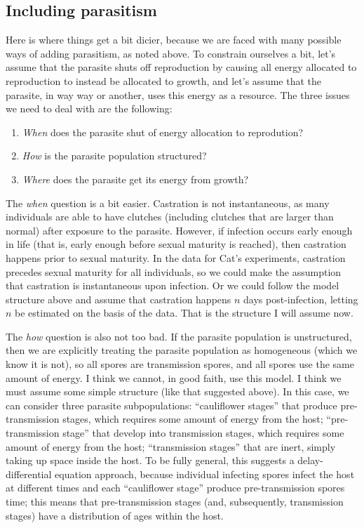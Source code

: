 \documentclass[11pt,reqno,final,pdftex]{amsart}\usepackage[]{graphicx}\usepackage[]{color}
\theoremstyle{plain}
\numberwithin{equation}{part}
\begin{document}
\subsection*{Including parasitism}
Here is where things get a bit dicier, because we are faced with many possible ways of adding parasitism, as noted above.
To constrain ourselves a bit, let's assume that the parasite shuts off reproduction by causing all energy allocated to reproduction to instead be allocated to growth, and let's assume that the parasite, in way way or another, uses this energy as a resource.
The three issues we need to deal with are the following:
\begin{enumerate}
\item \emph{When} does the parasite shut of energy allocation to reprodution?
\item \emph{How} is the parasite population structured?
\item \emph{Where} does the parasite get its energy from growth?
\end{enumerate}

The \emph{when} question is a bit easier.
Castration is not instantaneous, as many individuals are able to have clutches (including clutches that are larger than normal) after exposure to the parasite.
However, if infection occurs early enough in life (that is, early enough before sexual maturity is reached), then castration happens prior to sexual maturity.
In the data for Cat's experiments, castration precedes sexual maturity for all individuals, so we could make the assumption that castration is instantaneous upon infection.
Or we could follow the model structure above and assume that castration happens $n$ days post-infection, letting $n$ be estimated on the basis of the data.
That is the structure I will assume now.

The \emph{how} question is also not too bad.
If the parasite population is unstructured, then we are explicitly treating the parasite population as homogeneous (which we know it is not), so all spores are transmission spores, and all spores use the same amount of energy.
I think we cannot, in good faith, use this model.
I think we must assume some simple structure (like that suggested above).
In this case, we can consider three parasite subpopulations: ``cauliflower stages'' that produce pre-transmission stages, which requires some amount of energy from the host; ``pre-transmission stage'' that develop into transmission stages, which requires some amount of energy from the host; ``transmission stages'' that are inert, simply taking up space inside the host.
To be fully general, this suggests a delay-differential equation approach, because individual infecting spores infect the host at different times and each ``cauliflower stage'' produce pre-transmission spores time; this means that pre-transmission stages (and, subsequently, transmission stages) have a distribution of ages within the host.
\end{document}
